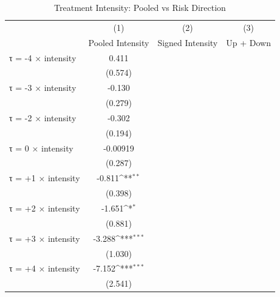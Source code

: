 \begin{table}[htbp]\centering\scriptsize\renewcommand{\arraystretch}{0.8}
\def\sym#1{\ifmmode^{#1}\else\(^{#1}\)\fi}
\caption{Treatment Intensity: Pooled vs Risk Direction}
\begin{tabular}{l*{3}{c}}
\hline\hline
                    &\multicolumn{1}{c}{(1)}&\multicolumn{1}{c}{(2)}&\multicolumn{1}{c}{(3)}\\
                    &\multicolumn{1}{c}{Pooled Intensity}&\multicolumn{1}{c}{Signed Intensity}&\multicolumn{1}{c}{Up + Down}\\
\hline
τ = -4 × intensity  &       0.411         &                     &                     \\
                    &     (0.574)         &                     &                     \\
[0.15em]
τ = -3 × intensity  &      -0.130         &                     &                     \\
                    &     (0.279)         &                     &                     \\
[0.15em]
τ = -2 × intensity  &      -0.302         &                     &                     \\
                    &     (0.194)         &                     &                     \\
[0.15em]
τ = 0 × intensity   &    -0.00919         &                     &                     \\
                    &     (0.287)         &                     &                     \\
[0.15em]
τ = +1 × intensity  &      -0.811\sym{**} &                     &                     \\
                    &     (0.398)         &                     &                     \\
[0.15em]
τ = +2 × intensity  &      -1.651\sym{*}  &                     &                     \\
                    &     (0.881)         &                     &                     \\
[0.15em]
τ = +3 × intensity  &      -3.288\sym{***}&                     &                     \\
                    &     (1.030)         &                     &                     \\
[0.15em]
τ = +4 × intensity  &      -7.152\sym{***}&                     &                     \\
                    &     (2.541)         &                     &                     \\

\end{tabular}
\end{table}
